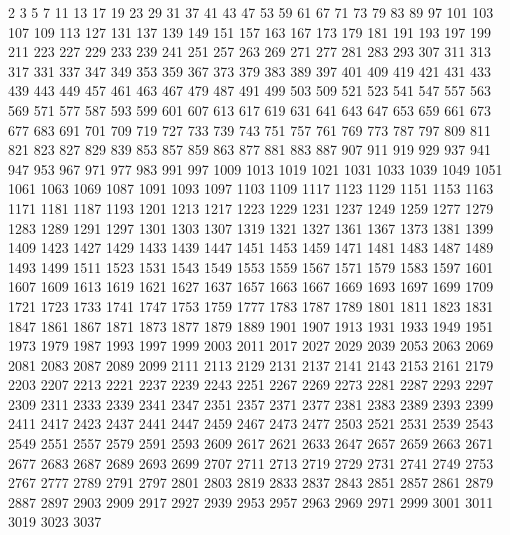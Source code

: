 \documentclass[11pt]{article}
\begin{document}
\begingroup\scriptsize
\begin{vncode}
    2     3     5     7    11    13    17    19    23    29    31    37    41    43    47
   53    59    61    67    71    73    79    83    89    97   101   103   107   109   113
  127   131   137   139   149   151   157   163   167   173   179   181   191   193   197
  199   211   223   227   229   233   239   241   251   257   263   269   271   277   281
  283   293   307   311   313   317   331   337   347   349   353   359   367   373   379
  383   389   397   401   409   419   421   431   433   439   443   449   457   461   463
  467   479   487   491   499   503   509   521   523   541   547   557   563   569   571
  577   587   593   599   601   607   613   617   619   631   641   643   647   653   659
  661   673   677   683   691   701   709   719   727   733   739   743   751   757   761
  769   773   787   797   809   811   821   823   827   829   839   853   857   859   863
  877   881   883   887   907   911   919   929   937   941   947   953   967   971   977
  983   991   997  1009  1013  1019  1021  1031  1033  1039  1049  1051  1061  1063  1069
 1087  1091  1093  1097  1103  1109  1117  1123  1129  1151  1153  1163  1171  1181  1187
 1193  1201  1213  1217  1223  1229  1231  1237  1249  1259  1277  1279  1283  1289  1291
 1297  1301  1303  1307  1319  1321  1327  1361  1367  1373  1381  1399  1409  1423  1427
 1429  1433  1439  1447  1451  1453  1459  1471  1481  1483  1487  1489  1493  1499  1511
 1523  1531  1543  1549  1553  1559  1567  1571  1579  1583  1597  1601  1607  1609  1613
 1619  1621  1627  1637  1657  1663  1667  1669  1693  1697  1699  1709  1721  1723  1733
 1741  1747  1753  1759  1777  1783  1787  1789  1801  1811  1823  1831  1847  1861  1867
 1871  1873  1877  1879  1889  1901  1907  1913  1931  1933  1949  1951  1973  1979  1987
 1993  1997  1999  2003  2011  2017  2027  2029  2039  2053  2063  2069  2081  2083  2087
 2089  2099  2111  2113  2129  2131  2137  2141  2143  2153  2161  2179  2203  2207  2213
 2221  2237  2239  2243  2251  2267  2269  2273  2281  2287  2293  2297  2309  2311  2333
 2339  2341  2347  2351  2357  2371  2377  2381  2383  2389  2393  2399  2411  2417  2423
 2437  2441  2447  2459  2467  2473  2477  2503  2521  2531  2539  2543  2549  2551  2557
 2579  2591  2593  2609  2617  2621  2633  2647  2657  2659  2663  2671  2677  2683  2687
 2689  2693  2699  2707  2711  2713  2719  2729  2731  2741  2749  2753  2767  2777  2789
 2791  2797  2801  2803  2819  2833  2837  2843  2851  2857  2861  2879  2887  2897  2903
 2909  2917  2927  2939  2953  2957  2963  2969  2971  2999  3001  3011  3019  3023  3037

\end{vncode}
\end{document}
